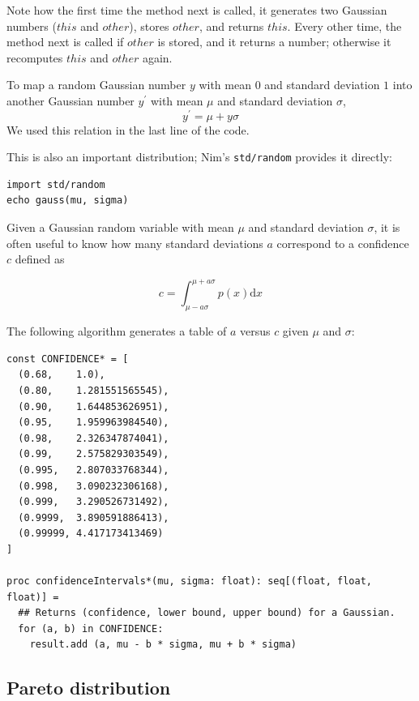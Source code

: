 \documentclass[justified, sixbynine]{tufte-book}
\def\ft{\small\tt}
\theoremstyle{plain}%
\newtheorem * {corollary}{Corollary}
\theoremstyle{definition}
\theoremstyle{remark}
\newtheorem * {remark}{Remark}
\newtheorem * {note}{Note}
\begin{document}
\begin{fullwidth}
Note how the first time the method next is called, it generates two Gaussian
numbers ($this$ and $other$), stores $other$, and returns $this$. Every other
time, the method next is called if $other$ is stored, and it returns a number;
otherwise it recomputes $this$ and $other$ again.

To map a random Gaussian number $y$ with mean $0$ and standard deviation $1$
into another Gaussian number $y^{\prime }$ with mean $\mu $ and standard
deviation $\sigma $, 
\begin{equation}
y^{\prime }=\mu +y\sigma
\end{equation}
We used this relation in the last line of the code.

This is also an important distribution; Nim's {\ft std/random} provides it directly:

\begin{lstlisting}
import std/random
echo gauss(mu, sigma)
\end{lstlisting}

Given a Gaussian random variable with mean $\mu$ and standard deviation $\sigma$, it is often useful to know how many standard deviations $a$ correspond to a confidence $c$ defined as

\begin{equation}
c = \int_{\mu-a\sigma}^{\mu+a\sigma} p(x)\textrm{d}x
\end{equation}

The following algorithm generates a table of $a$ versus $c$ given $\mu$ and $\sigma$:


\begin{lstlisting}[caption={in file: {\ft nlib.nim}}]
const CONFIDENCE* = [
  (0.68,    1.0),
  (0.80,    1.281551565545),
  (0.90,    1.644853626951),
  (0.95,    1.959963984540),
  (0.98,    2.326347874041),
  (0.99,    2.575829303549),
  (0.995,   2.807033768344),
  (0.998,   3.090232306168),
  (0.999,   3.290526731492),
  (0.9999,  3.890591886413),
  (0.99999, 4.417173413469)
]

proc confidenceIntervals*(mu, sigma: float): seq[(float, float, float)] =
  ## Returns (confidence, lower bound, upper bound) for a Gaussian.
  for (a, b) in CONFIDENCE:
    result.add (a, mu - b * sigma, mu + b * sigma)
\end{lstlisting}


\goodbreak\subsection{Pareto distribution}


\end{fullwidth}
\end{document}
